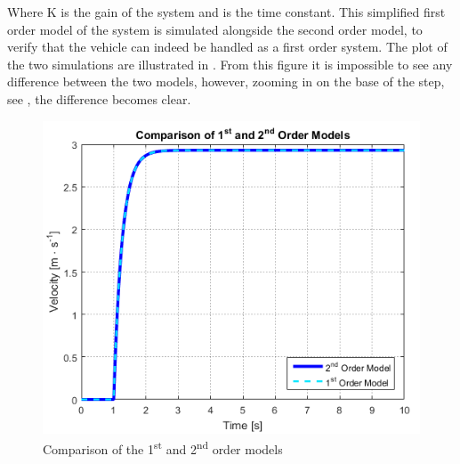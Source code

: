 %
Where \si{K} is the gain of the system and \si{\tau} is the time constant. This simplified first order model of the system is simulated alongside the second order model, to verify that the vehicle can indeed be handled as a first order system. The plot of the two simulations are illustrated in .
%
From this figure it is impossible to see any difference between the two models, however, zooming in on the base of the step, see , the difference becomes clear.
%
\begin{minipage}{\linewidth}
  	\centering
  	\begin{minipage}{0.45\linewidth}
  		\begin{figure}[H]
  			\centering
  			\includegraphics[scale = .6]{figures/ComparisonOf1stAnd2ndOrderModels.png}
  			\caption{Comparison of the \si{1^{st}} and \si{2^{nd}} order models}
  			\label{fig:ComparisonOf1stAnd2ndOrderModels}
  		\end{figure}\vspace{-5mm}
  	\end{minipage}
  	\hspace{0.03\linewidth}
  	\begin{minipage}{0.45\linewidth}
  	  \begin{figure}[H]
    	 	\centering

\end{figure}
\end{minipage}
\end{minipage}
